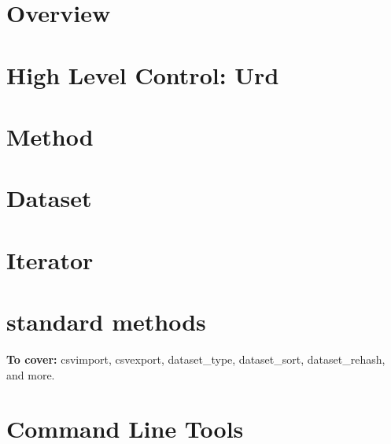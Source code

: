\documentclass[a4paper]{report}
\begin{document}




\chapter{Overview}


\chapter{High Level Control:  Urd}


\chapter{Method}


\chapter{Dataset}


\chapter{Iterator}


\chapter{standard methods}
\textbf{To cover:} csvimport, csvexport, dataset\_type, dataset\_sort, dataset\_rehash, and more.


\chapter{Command Line Tools}


%
\end{document}
